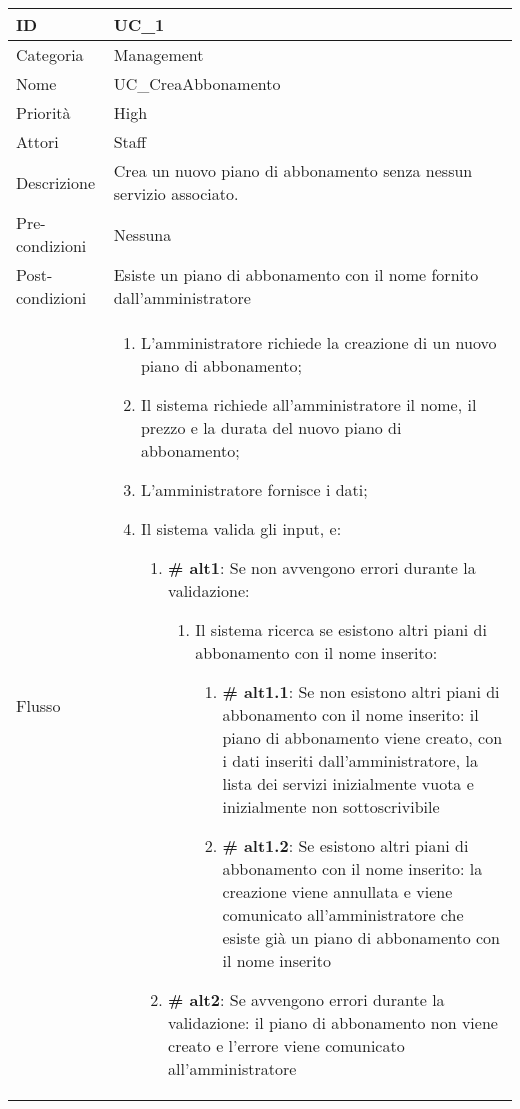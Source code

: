 \begin{center}
\begin{tabular}{ |p{2cm}|p{13cm}|  }
\hline
ID & UC\_1 \\\hline
Categoria & Management\\\hline
Nome & UC\_CreaAbbonamento\\\hline
Priorità & High \\\hline
Attori &  Staff \\\hline
Descrizione & Crea un nuovo piano di abbonamento senza nessun servizio associato.\\\hline
Pre-condizioni &  Nessuna\\\hline
Post-condizioni &  Esiste un piano di abbonamento con il nome fornito dall'amministratore\\\hline
Flusso &  	\begin{enumerate}
			\item L'amministratore richiede la creazione di un nuovo piano di abbonamento;
			\item Il sistema richiede all'amministratore il nome, il prezzo e la durata del nuovo piano di abbonamento;
			\item L'amministratore fornisce i dati;
			\item Il sistema valida gli input, e:
				\begin{enumerate}[  ]
				\item \textbf{\# alt1}: Se non avvengono errori durante la validazione:
					\begin{enumerate}[label*=\arabic*.]
					\item Il sistema ricerca se esistono altri piani di abbonamento con il nome inserito:
						\begin{enumerate}[label*=\arabic*.]
						\item \textbf{\# alt1.1}: Se non esistono altri piani di abbonamento con il nome inserito: il piano di abbonamento viene creato, con i dati inseriti dall'amministratore, la lista dei servizi inizialmente vuota e inizialmente non sottoscrivibile
						\item \textbf{\# alt1.2}: Se esistono altri piani di abbonamento con il nome inserito: la creazione viene annullata e viene comunicato all'amministratore che esiste già un piano di abbonamento con il nome inserito	
						\end{enumerate}
					\end{enumerate}
				\item \textbf{\# alt2}: Se avvengono errori durante la validazione: il piano di abbonamento non viene creato e l'errore viene comunicato all'amministratore
				\end{enumerate}
			

\end{enumerate}
\end{tabular}
\end{center}
